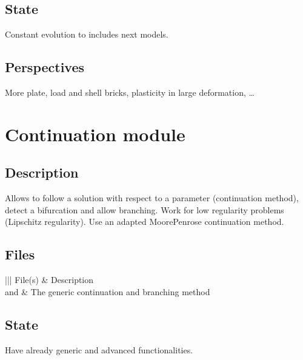 \documentclass[a4paper,11pt,english]{sphinxmanual}
\begin{document}
\subsection{State}
\label{\detokenize{project/libdesc_model:state}}
Constant evolution to includes next models.


\subsection{Perspectives}
\label{\detokenize{project/libdesc_model:perspectives}}
More plate, load and shell bricks, plasticity in large deformation, …


\section{Continuation module}
\label{\detokenize{project/libdesc_cont:continuation-module}}\label{\detokenize{project/libdesc_cont:dp-libdesc-cont}}\label{\detokenize{project/libdesc_cont::doc}}

\subsection{Description}
\label{\detokenize{project/libdesc_cont:description}}
Allows to follow a solution with respect to a parameter (continuation method), detect a bifurcation and allow branching. Work for low regularity problems (Lipschitz regularity). Use an adapted Moore\sphinxhyphen{}Penrose continuation method.


\subsection{Files}
\label{\detokenize{project/libdesc_cont:files}}

\begin{savenotes}\sphinxattablestart
\centering
\begin{tabular}[t]{|||}
\hline
\sphinxstyletheadfamily 
File(s)
&\sphinxstyletheadfamily 
Description
\\
\hline
{} and 
&
The generic continuation and branching method
\\
\hline
\end{tabular}
\par
\sphinxattableend\end{savenotes}


\subsection{State}
\label{\detokenize{project/libdesc_cont:state}}
Have already generic and advanced functionalities.
\end{document}
